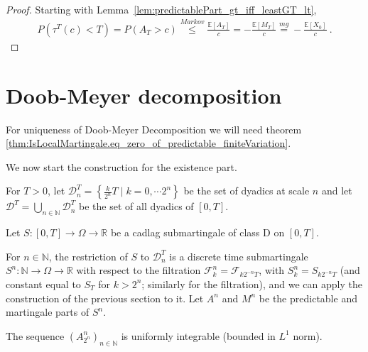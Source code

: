 \begin{proof}
Starting with Lemma~\ref{lem:predictablePart_gt_iff_leastGT_lt},
\begin{align*}
  P(\tau^T(c)<T)
  =P(A_T>c)
  \stackrel{Markov}{\leq}\frac{\mathbb{E}[A_T]}{c}
  =-\frac{\mathbb{E}[M_T]}{c}
  \stackrel{mg}{=}-\frac{\mathbb{E}[X_0]}{c}
  \: .
\end{align*}
\end{proof}





\section{Doob-Meyer decomposition}



For uniqueness of Doob-Meyer Decomposition we will need theorem
\ref{thm:IsLocalMartingale.eq_zero_of_predictable_finiteVariation}.

We now start the construction for the existence part.


\begin{definition}[Dyadics]\label{def:dyadics}
For $T>0$, let $\mathcal{D}_n^T = \left\lbrace \frac{k}{2^n}T \mid k=0,\cdots 2^n\right\rbrace$ be the set of dyadics at scale $n$ and let $\mathcal{D}^T=\bigcup_{n\in\mathbb{N}}\mathcal{D}_n^T$ be the set of all dyadics of $[0,T]$.
\end{definition}

Let $S : [0,T] \to \Omega \to \mathbb{R}$ be a cadlag submartingale of class D on $[0,T]$.



\begin{definition}[S, A, M]\label{def:SAM}
For $n \in \mathbb{N}$, the restriction of $S$ to $\mathcal{D}_n^T$ is a discrete time submartingale $S^n : \mathbb{N} \to \Omega \to \mathbb{R}$ with respect to the filtration $\mathcal{F}^n_k = \mathcal{F}_{k2^{-n}T}$, with $S^n_k = S_{k2^{-n}T}$ (and constant equal to $S_T$ for $k > 2^n$; similarly for the filtration), and we can apply the construction of the previous section to it.
Let $A^n$ and $M^n$ be the predictable and martingale parts of $S^n$.
\end{definition}


\begin{lemma}\label{lem:A_uniform_integrable}
  The sequence $(A^n_{2^n})_{n\in\mathbb{N}}$ is uniformly integrable (bounded in $L^1$ norm).
\end{lemma}


